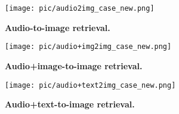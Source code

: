 \documentclass{article}
\begin{document}
\begin{figure*}[t]
    \centering
    \texttt{[image: pic/audio2img\_case\_new.png]}
    \caption{\textbf{Audio-to-image retrieval.}}
    \label{fig:audio2img}
\end{figure*}

\begin{figure*}[t]
    \centering
    \texttt{[image: pic/audio+img2img\_case\_new.png]}
    \caption{\textbf{Audio+image-to-image retrieval.}}
    \label{fig:audioimg2img}
\end{figure*}

\begin{figure*}[t]
    \centering
    \texttt{[image: pic/audio+text2img\_case\_new.png]}
    \caption{\textbf{Audio+text-to-image retrieval.}}
    \label{fig:audiotext2img}
\end{figure*} 
\end{document}
